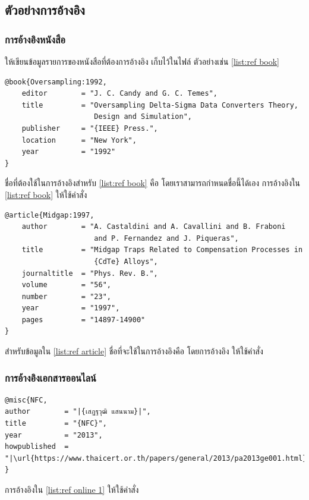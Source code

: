\subsection{ตัวอย่างการอ้างอิง}

\subsubsection{การอ้างอิงหนังสือ}

ให้เขียนข้อมูลรายการของหนังสือที่ต้องการอ้างอิง เก็บไว้ในไฟล์  ตัวอย่างเช่น \autoref{list:ref book}

\begin{lstlisting}[caption={ตัวอย่างการอ้างอิงหนังสือ},label={list:ref book}]
@book{Oversampling:1992,
    editor        = "J. C. Candy and G. C. Temes",
    title         = "Oversampling Delta-Sigma Data Converters Theory,
                     Design and Simulation",
    publisher     = "{IEEE} Press.",
    location      = "New York",
    year          = "1992"
}
\end{lstlisting}

ชื่อที่ต้องใช้ในการอ้างอิงสำหรับ \autoref{list:ref book} คือ  โดยเราสามารถ\mbox{กำหนด}ชื่อนี้ได้เอง การอ้างอิงใน \autoref{list:ref book} ให้ใช้คำสั่ง  \cite{Oversampling:1992}


\begin{lstlisting}[caption={ตัวอย่างการอ้างอิงบทความ},label={list:ref article}]
@article{Midgap:1997,
    author        = "A. Castaldini and A. Cavallini and B. Fraboni
                     and P. Fernandez and J. Piqueras",
    title         = "Midgap Traps Related to Compensation Processes in
                     {CdTe} Alloys",
    journaltitle  = "Phys. Rev. B.",
    volume        = "56",
    number        = "23",
    year          = "1997",
    pages         = "14897-14900"
}
\end{lstlisting}

สำหรับข้อมูลใน \autoref{list:ref article} ชื่อที่จะใช้ในการอ้างอิงคือ  โดยการ\mbox{อ้างอิง} ให้ใช้คำสั่ง  \cite{Midgap:1997}

\subsubsection{การอ้างอิงเอกสารออนไลน์}

\begin{lstlisting}[caption={ตัวอย่างการอ้างอิงเอกสารออนไลน์ 1},label={list:ref online 1}]
@misc{NFC,
author        = "|{เสฏฐวุฒิ แสนนาม}|",
title         = "{NFC}",
year          = "2013",
howpublished  = "|\url{https://www.thaicert.or.th/papers/general/2013/pa2013ge001.html}|",
}
\end{lstlisting}

การอ้างอิงใน \autoref{list:ref online 1} ให้ใช้คำสั่ง  \cite{NFC}


